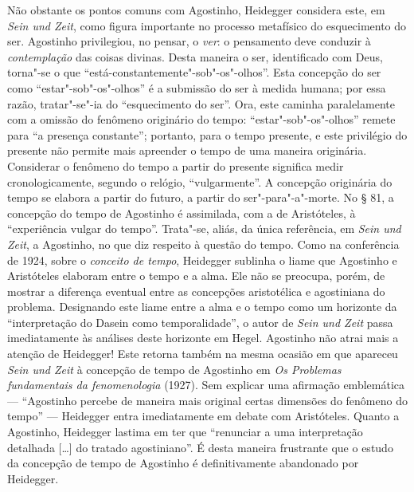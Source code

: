 Não obstante os pontos comuns com Agostinho, Heidegger considera
este, em \emph{Sein und Zeit}, como figura importante no
processo metafísico do esquecimento do ser. Agostinho
privilegiou, no pensar, o \emph{ver}: o pensamento deve
conduzir à \emph{contemplação} das coisas divinas. Desta
maneira o ser, identificado com Deus, torna"-se o que
“está-constantemente"-sob"-os"-olhos”. Esta concepção do ser como
“estar"-sob"-os"-olhos” é a submissão do ser à medida humana; por
essa razão, tratar"-se"-ia do “esquecimento do ser”. Ora, este
caminha paralelamente com a omissão do fenômeno originário do
tempo: “estar"-sob"-os"-olhos” remete para “a presença constante”;
portanto, para o tempo presente, e este privilégio do presente
não permite mais apreender o tempo de uma maneira originária.
Considerar o fenômeno do tempo a partir do presente significa
medir cronologicamente, segundo o relógio, “vulgarmente”. A
concepção originária do tempo se elabora a partir do futuro, a
partir do ser"-para"-a"-morte. No § 81, a concepção do tempo de
Agostinho é assimilada, com a de Aristóteles, à “experiência
vulgar do tempo”. Trata"-se, aliás, da única referência, em
\emph{Sein und Zeit}, a Agostinho, no que diz respeito à
questão do tempo. Como na conferência de 1924, sobre o
\emph{conceito de tempo}, Heidegger sublinha o liame que
Agostinho e Aristóteles elaboram entre o tempo e a alma. Ele não
se preocupa, porém, de mostrar a diferença eventual entre as
concepções aristotélica e agostiniana do problema. Designando
este liame entre a alma e o tempo como um horizonte da
“interpretação do Dasein como temporalidade”, o autor de
\emph{Sein und Zeit} passa imediatamente às análises deste
horizonte em Hegel. Agostinho não atrai mais a atenção de
Heidegger! Este retorna também na mesma ocasião em que apareceu
\emph{Sein und Zeit} à concepção de tempo de Agostinho em
\emph{Os Problemas fundamentais da fenomenologia} (1927). Sem
explicar uma afirmação emblemática --- “Agostinho percebe de
maneira mais original certas dimensões do fenômeno do tempo” ---
Heidegger entra imediatamente em debate com Aristóteles. Quanto
a Agostinho, Heidegger lastima em ter que “renunciar a uma
interpretação detalhada [\ldots{}] do tratado agostiniano”. É desta
maneira frustrante que o estudo da concepção de tempo de
Agostinho é definitivamente abandonado por Heidegger.  

